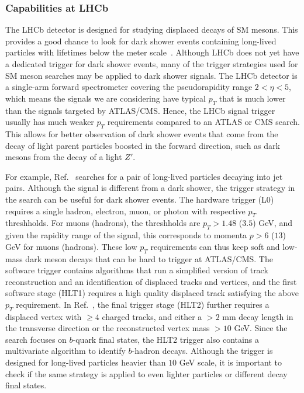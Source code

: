 \subsubsection{Capabilities at LHCb}

The LHCb detector is designed for studying displaced decays of SM mesons. This provides a good chance to look for dark shower events containing long-lived particles with lifetimes below the meter scale~\cite{Strassler:2006qa}. Although LHCb does not yet have a dedicated trigger for dark shower events, many of the trigger strategies used for SM meson searches may be applied to dark shower signals. The LHCb detector is a single-arm forward spectrometer covering the pseudorapidity range $2<\eta<5$, which means the signals we are considering have typical $p_T$ that is much lower than the signals targeted by ATLAS/CMS. Hence, the LHCb signal trigger usually has much weaker $p_T$ requirements compared to an ATLAS or CMS search. This allows for better observation of dark shower events that come from the decay of light parent particles boosted in the forward direction, such as dark mesons from the decay of a light $Z'$.

For example, Ref.~\cite{Aaij:2014nma} searches for a pair of long-lived particles decaying into jet pairs. Although the signal is different from a dark shower, the trigger strategy in the search can be useful for dark shower events. The hardware trigger (L0) requires a single hadron, electron, muon, or photon with respective $p_T$ threshholds. For muons (hadrons), the threshholds are $p_T>1.48$ ($3.5$) GeV, and given the rapidity range of the signal, this corresponds to momenta $p> 6$ ($13$) GeV for muons (hadrons). These low $p_T$ requirements can thus keep soft and low-mass dark meson decays that can be hard to trigger at ATLAS/CMS. The software trigger contains algorithms that run a simplified version of track reconstruction and an identification of displaced tracks and vertices, and the first software stage (HLT1) requires a high quality displaced track satisfying the above $p_T$ requirement. In Ref.~\cite{Aaij:2014nma}, the final trigger stage (HLT2) further requires a displaced vertex with $\geq 4$ charged tracks, and either a $>2$ mm decay length in the transverse direction or the reconstructed vertex mass $>10$ GeV. Since the search focuses on $b$-quark final states, the HLT2 trigger also contains a multivariate algorithm to identify $b$-hadron decays. Although the trigger is designed for long-lived particles heavier than $10$ GeV scale, it is important to check if the same strategy is applied to even lighter particles or different decay final states.

